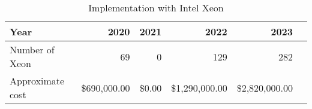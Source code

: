\tiny \begin{longtable} { |p{}  |r  |r  |r  |r  |r |} 
\caption{Implementation with Intel Xeon \label{tab:Xeon}}\\ 
\hline 
\textbf{Year}&\textbf{2020}&\textbf{2021}&\textbf{2022}&\textbf{2023} \\ \hline
{Number of Xeon}&{69}&{0}&{129}&{282} \\ \hline
{Approximate cost}&{\$690,000.00}&{\$0.00}&{\$1,290,000.00}&{\$2,820,000.00} \\ \hline
\end{longtable} \normalsize
